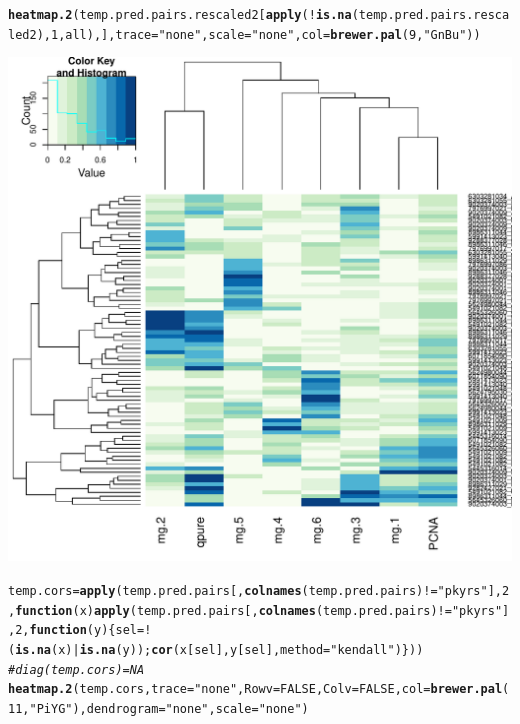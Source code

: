 \documentclass{article}\usepackage[]{graphicx}\usepackage[]{color}
\makeatletter
\def\maxwidth{ %
  \ifdim\Gin@nat@width>\linewidth
    \linewidth
  \else
    \Gin@nat@width
  \fi
}
\newcommand{\hlnum}[1]{\textcolor[rgb]{0.686,0.059,0.569}{#1}}%
\newcommand{\hlstr}[1]{\textcolor[rgb]{0.192,0.494,0.8}{#1}}%
\newcommand{\hlcom}[1]{\textcolor[rgb]{0.678,0.584,0.686}{\textit{#1}}}%
\newcommand{\hlopt}[1]{\textcolor[rgb]{0,0,0}{#1}}%
\newcommand{\hlstd}[1]{\textcolor[rgb]{0.345,0.345,0.345}{#1}}%
\newcommand{\hlkwa}[1]{\textcolor[rgb]{0.161,0.373,0.58}{\textbf{#1}}}%
\newcommand{\hlkwb}[1]{\textcolor[rgb]{0.69,0.353,0.396}{#1}}%
\newcommand{\hlkwc}[1]{\textcolor[rgb]{0.333,0.667,0.333}{#1}}%
\newcommand{\hlkwd}[1]{\textcolor[rgb]{0.737,0.353,0.396}{\textbf{#1}}}%
\newenvironment{kframe}{%
 \def\at@end@of@kframe{}%
 \ifinner\ifhmode%
  \def\at@end@of@kframe{\end{minipage}}%
  \begin{minipage}{\columnwidth}%
 \fi\fi%
 \def\FrameCommand##1{\hskip\@totalleftmargin \hskip-\fboxsep
 \colorbox{shadecolor}{##1}\hskip-\fboxsep
     \hskip-\linewidth \hskip-\@totalleftmargin \hskip\columnwidth}%
 \MakeFramed {\advance\hsize-\width
   \@totalleftmargin\z@ \linewidth\hsize
   \@setminipage}}%
 {\par\unskip\endMakeFramed%
 \at@end@of@kframe}
\newenvironment{knitrout}{}{} %
\makeatother
\begin{document}
\begin{knitrout}
{}


\begin{kframe}\begin{alltt}
\hlkwd{heatmap.2}\hlstd{(temp.pred.pairs.rescaled2[}\hlkwd{apply}\hlstd{(}\hlopt{!}\hlkwd{is.na}\hlstd{(temp.pred.pairs.rescaled2),} \hlnum{1}\hlstd{, all),],} \hlkwc{trace} \hlstd{=} \hlstr{"none"}\hlstd{,} \hlkwc{scale} \hlstd{=} \hlstr{"none"}\hlstd{,} \hlkwc{col} \hlstd{=} \hlkwd{brewer.pal}\hlstd{(}\hlnum{9}\hlstd{,} \hlstr{"GnBu"}\hlstd{))}
\end{alltt}
\end{kframe}

{\centering \includegraphics[width=\maxwidth]{figure/metagene-pairs-5} 

}


\begin{kframe}\begin{alltt}
\hlstd{temp.cors} \hlkwb{=} \hlkwd{apply}\hlstd{(temp.pred.pairs[,}\hlkwd{colnames}\hlstd{(temp.pred.pairs)} \hlopt{!=} \hlstr{"pkyrs"}\hlstd{],} \hlnum{2}\hlstd{,} \hlkwa{function}\hlstd{(}\hlkwc{x}\hlstd{)} \hlkwd{apply}\hlstd{(temp.pred.pairs[,}\hlkwd{colnames}\hlstd{(temp.pred.pairs)} \hlopt{!=} \hlstr{"pkyrs"}\hlstd{],} \hlnum{2}\hlstd{,} \hlkwa{function}\hlstd{(}\hlkwc{y}\hlstd{) \{ sel} \hlkwb{=} \hlopt{!}\hlstd{(}\hlkwd{is.na}\hlstd{(x)} \hlopt{|} \hlkwd{is.na}\hlstd{(y));} \hlkwd{cor}\hlstd{(x[sel], y[sel],} \hlkwc{method} \hlstd{=} \hlstr{"kendall"}\hlstd{) \} ))}
\hlcom{#diag(temp.cors) = NA}
\hlkwd{heatmap.2}\hlstd{(temp.cors,} \hlkwc{trace} \hlstd{=} \hlstr{"none"}\hlstd{,} \hlkwc{Rowv} \hlstd{=} \hlnum{FALSE}\hlstd{,} \hlkwc{Colv} \hlstd{=} \hlnum{FALSE}\hlstd{,} \hlkwc{col} \hlstd{=} \hlkwd{brewer.pal}\hlstd{(}\hlnum{11}\hlstd{,} \hlstr{"PiYG"}\hlstd{),} \hlkwc{dendrogram} \hlstd{=} \hlstr{"none"}\hlstd{,} \hlkwc{scale} \hlstd{=} \hlstr{"none"}\hlstd{)}
\end{alltt}
\end{kframe}


\end{knitrout}
\end{document}
